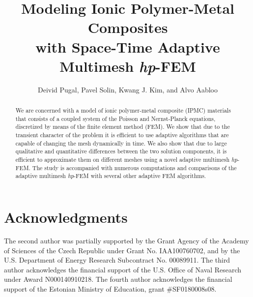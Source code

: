 \documentclass[mathpazo]{cicp}
\begin{document}
\title{Modeling Ionic Polymer-Metal Composites\\ with Space-Time Adaptive Multimesh \emph{hp}-FEM}


\author[Deivid Pugal et.~al.]{Deivid Pugal\comma{},
Pavel Solin\comma{}\comma\corrauth,
Kwang J. Kim, and Alvo Aabloo}

\address{\ Mechanical Engineering Department, University of Nevada, Reno, NV, U.S.A.\\
\ Department of Mathematics and Statistics, University of Nevada, Reno, NV, U.S.A.\\
\ Institute of Thermomechanics, Prague, Czech Republic\\
\ Institute of Technology, Tartu University, Estonia}


\begin{abstract}
We are concerned with a model of ionic polymer-metal composite (IPMC) materials
that consists of a coupled system of the Poisson and Nernst-Planck equations, 
discretized by means of the finite element method (FEM). We show that due to the 
transient character of the problem it is efficient to use adaptive algorithms 
that are capable of changing the mesh dynamically in time. We also show 
that due to large qualitative and quantitative differences between the 
two solution components, it is efficient to approximate them on different 
meshes using a novel adaptive multimesh \emph{hp}-FEM. The study is 
accompanied with numerous computations and comparisons of the adaptive 
multimesh \emph{hp}-FEM with several other adaptive FEM algorithms. 
\end{abstract}

\maketitle








\section*{Acknowledgments}
The second author was partially supported by the Grant Agency of the Academy of 
Sciences of the Czech Republic under Grant No. IAA100760702, and by the U.S.
Department of Energy Research Subcontract No. 00089911. 
The third author acknowledges the financial support of the U.S. Office of Naval Research 
under Award N000140910218. The fourth author acknowledges the financial support of
the Estonian Ministry of Education, grant \#SF0180008s08.

\newpage

\end{document}
